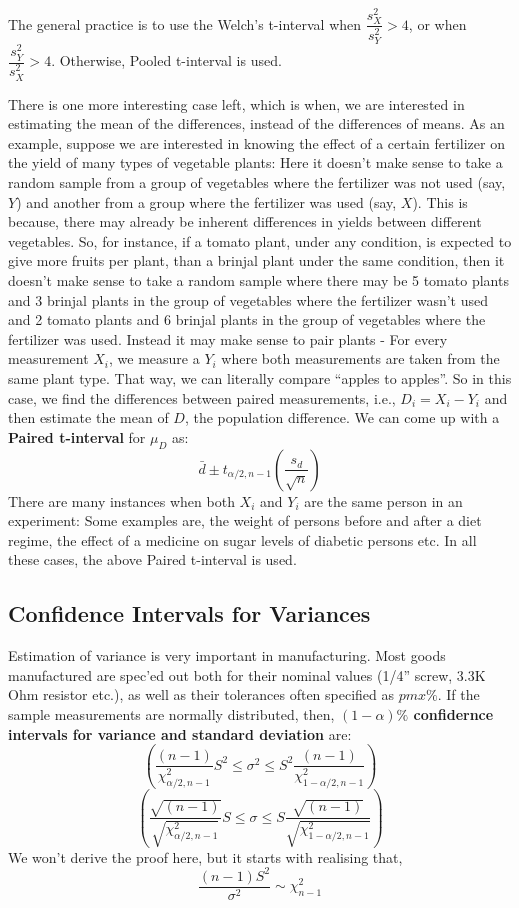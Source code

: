 The general practice is to use the Welch's t-interval when \(\dfrac{s^2_X}{s^2_Y} > 4\), or when \(\dfrac{s^2_Y}{s^2_X} > 4\). Otherwise, Pooled t-interval is used.

There is one more interesting case left, which is when, we are interested in estimating the mean of the differences, instead of the differences of means. As an example, suppose we are interested in knowing the effect of a certain fertilizer on the yield of many types of vegetable plants: Here it doesn't make sense to take a random sample from a group of vegetables where the fertilizer was not used (say, $Y$) and another from a group where the fertilizer was used (say, $X$). This is because, there may already be inherent differences in yields between different vegetables. So, for instance, if a tomato plant, under any condition, is expected to give more fruits per plant, than a brinjal plant under the same condition, then it doesn't make sense to take a random sample where there may be 5 tomato plants and 3 brinjal plants in the group of vegetables where the fertilizer wasn't used and 2 tomato plants and 6 brinjal plants in the group of vegetables where the fertilizer was used. Instead it may make sense to pair plants - For every measurement $X_i$, we measure a $Y_i$ where both measurements are taken from the same plant type. That way, we can literally compare ``apples to apples''. So in this case, we find the differences between paired measurements, i.e., \( D_i = X_i - Y_i \) and then estimate the mean of $D$, the population difference. We can come up with a \textbf{Paired t-interval} for $\mu_D$ as:
	\[ \bar{d} \pm t_{\alpha/2,n-1}\left(\dfrac{s_d}{\sqrt{n}}\right) \]
There are many instances when both $X_i$ and $Y_i$ are the same person in an experiment: Some examples are, the weight of persons before and after a diet regime, the effect of a medicine on sugar levels of diabetic persons etc. In all these cases, the above Paired t-interval is used.

\subsection {Confidence Intervals for Variances}
Estimation of variance is very important in manufacturing. Most goods manufactured are spec'ed out both for their nominal values (1/4'' screw, 3.3K Ohm resistor etc.), as well as their tolerances often specified as $pm x\%$. If the sample measurements are normally distributed, then, \textbf{\((1-\alpha)\%\) confidernce intervals for variance and standard deviation} are:
	\[ \left(\dfrac{(n-1)}{\chi^2_{\alpha/2,n-1}} S^2 \leq \sigma^2 \leq S^2\dfrac{(n-1)}{\chi^2_{1-\alpha/2,n-1}}\right) \]
	\[ \left(\dfrac{\sqrt{(n-1)}}{\sqrt{\chi^2_{\alpha/2,n-1}}} S \leq \sigma \leq S \dfrac{\sqrt{(n-1)}}{\sqrt{\chi^2_{1-\alpha/2,n-1}}}\right) \]
We won't derive the proof here, but it starts with realising that, 
	\[ \frac{(n-1)S^2}{\sigma^2} \sim \chi^2_{n-1} \]
	
